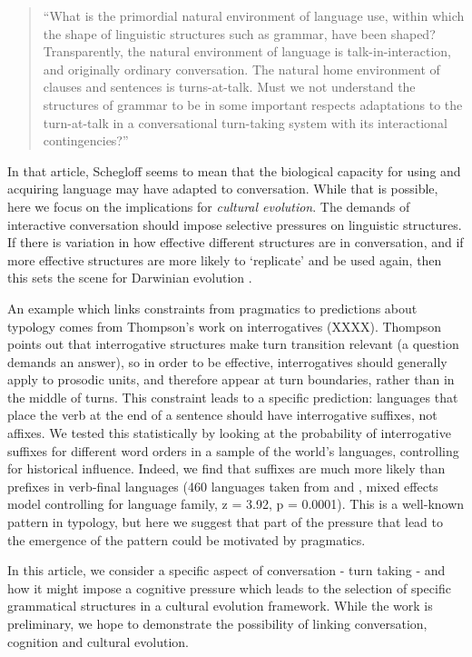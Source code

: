 \documentclass[12pt]{article}
\begin{document}
\begin{quote}
``What is the primordial natural environment of language use, within which the shape of linguistic structures such as grammar, have been shaped? Transparently, the natural environment of language is talk-in-interaction, and originally ordinary conversation.  The natural home environment of clauses and sentences is turns-at-talk.  Must we not understand the structures of grammar to be in some important respects adaptations to the turn-at-talk in a conversational turn-taking system with its interactional contingencies?'' \cite[p. 143-144]{schegloff1989reflections}
\end{quote}

In that article, Schegloff seems to mean that the biological capacity for using and acquiring language may have adapted to conversation.  While that is possible, here we focus on the implications for \emph{cultural evolution}.  The demands of interactive conversation should impose selective pressures on linguistic structures.  If there is variation in how effective different structures are in conversation, and if more effective structures are more likely to `replicate' and be used again, then this sets the scene for Darwinian evolution \cite{Croft_2000}.  


An example which links constraints from pragmatics to predictions about typology comes from Thompson's work on interrogatives (XXXX).  Thompson points out that interrogative structures make turn transition relevant (a question demands an answer), so in order to be effective, interrogatives should generally apply to prosodic units, and therefore appear at turn boundaries, rather than in the middle of turns.  This constraint leads to a specific prediction: languages that place the verb at the end of a sentence should have interrogative suffixes, not affixes.  We tested this statistically by looking at the probability of interrogative suffixes for different word orders in a sample of the world's languages, controlling for historical influence.  Indeed, we find that suffixes are much more likely than prefixes in verb-final languages (460 languages taken from \citealp{wals-26} and \citealp{wals-81}, mixed effects model controlling for language family, z = 3.92, p = 0.0001).  This is a well-known pattern in typology, but here we suggest that part of the pressure that lead to the emergence of the pattern could be motivated by pragmatics.


In this article, we consider a specific aspect of conversation - turn taking - and how it might impose a cognitive pressure which leads to the selection of specific grammatical structures in a cultural evolution framework.  While the work is preliminary, we hope to demonstrate the possibility of linking conversation, cognition and cultural evolution.
\end{document}
